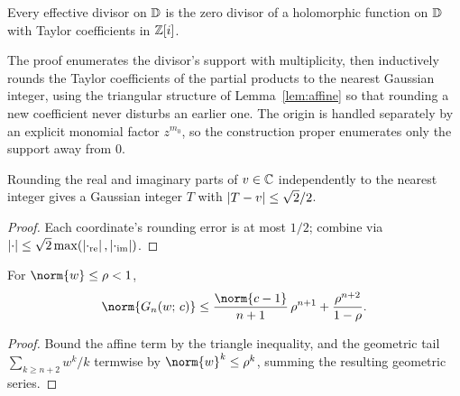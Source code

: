 \begin{theorem}
  \label{thm:propZi}
  \leanok
  Every effective divisor on $\mathbb{D}$ is the zero divisor of a holomorphic
  function on $\mathbb{D}$ with Taylor coefficients in $\mathbb{Z}[i]$.
\end{theorem}

The proof enumerates the divisor's support with multiplicity, then
inductively rounds the Taylor coefficients of the partial products to
the nearest Gaussian integer, using the triangular structure of
Lemma~\ref{lem:affine} so that rounding a new coefficient never disturbs
an earlier one. The origin is handled separately by an explicit monomial
factor $z^{m_0}$, so the construction proper enumerates only the support
away from $0$.

\begin{lemma}
  \label{lem:nearestGaussianInt}
  \leanok
  Rounding the real and imaginary parts of $v \in \mathbb{C}$ independently to
  the nearest integer gives a Gaussian integer $T$ with
  $\left|T - v\right| \le \sqrt2/2$.
\end{lemma}
\begin{proof}
  \leanok
  Each coordinate's rounding error is at most $1/2$; combine via
  $\left|\cdot\right| \le \sqrt2 \max(\left|\cdot_{\mathrm{re}}\right|,
  \left|\cdot_{\mathrm{im}}\right|)$.
\end{proof}

\begin{lemma}
  \label{lem:normG}
  \leanok
  For $\norm{w} \le \rho < 1$,
  \[
    \norm{G_n(w;\,c)} \le \frac{\norm{c-1}}{n+1}\,\rho^{n+1}
      + \frac{\rho^{n+2}}{1-\rho}.
  \]
\end{lemma}
\begin{proof}
  \leanok
  Bound the affine term by the triangle inequality, and the geometric
  tail $\sum_{k \ge n+2} w^k/k$ termwise by $\norm{w}^k \le \rho^k$,
  summing the resulting geometric series.
\end{proof}

